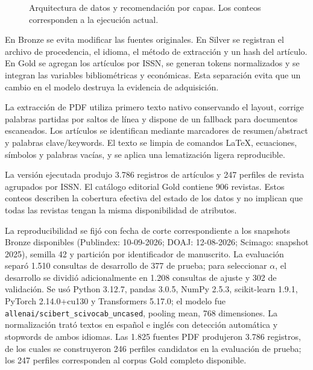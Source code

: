 \documentclass[12pt,a4paper]{article}
\begin{document}
\begin{figure}[htbp]
\caption{Arquitectura de datos y recomendación por capas. Los conteos corresponden a la ejecución actual.}
\label{fig:arquitectura}
\end{figure}

En Bronze se evita modificar las fuentes originales. En Silver se registran el archivo de procedencia, el idioma, el método de extracción y un hash del artículo. En Gold se agregan los artículos por ISSN, se generan tokens normalizados y se integran las variables bibliométricas y económicas. Esta separación evita que un cambio en el modelo destruya la evidencia de adquisición.

La extracción de PDF utiliza primero texto nativo conservando el layout, corrige palabras partidas por saltos de línea y dispone de un fallback para documentos escaneados. Los artículos se identifican mediante marcadores de resumen/abstract y palabras clave/keywords. El texto se limpia de comandos LaTeX, ecuaciones, símbolos y palabras vacías, y se aplica una lematización ligera reproducible.

La versión ejecutada produjo 3.786 registros de artículos y 247 perfiles de revista agrupados por ISSN. El catálogo editorial Gold contiene 906 revistas. Estos conteos describen la cobertura efectiva del estado de los datos y no implican que todas las revistas tengan la misma disponibilidad de atributos.

La reproducibilidad se fijó con fecha de corte correspondiente a los snapshots Bronze disponibles (Publindex: 10-09-2026; DOAJ: 12-08-2026; Scimago: snapshot 2025), semilla 42 y partición por identificador de manuscrito. La evaluación separó 1.510 consultas de desarrollo de 377 de prueba; para seleccionar $\alpha$, el desarrollo se dividió adicionalmente en 1.208 consultas de ajuste y 302 de validación. Se usó Python 3.12.7, pandas 3.0.5, NumPy 2.5.3, scikit-learn 1.9.1, PyTorch 2.14.0+cu130 y Transformers 5.17.0; el modelo fue \texttt{allenai/scibert\_scivocab\_uncased}, pooling mean, 768 dimensiones. La normalización trató textos en español e inglés con detección automática y stopwords de ambos idiomas. Las 1.825 fuentes PDF produjeron 3.786 registros, de los cuales se construyeron 246 perfiles candidatos en la evaluación de prueba; los 247 perfiles corresponden al corpus Gold completo disponible.
\end{document}
